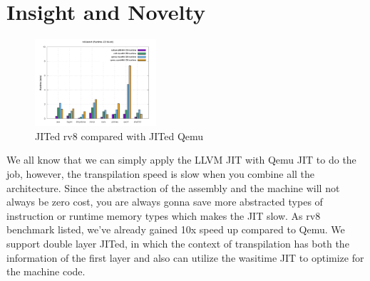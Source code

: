 \documentclass{article}
\begin{document}
\section{Insight and Novelty}
\begin{figure}[htbp]
\centering
   \includegraphics[width=0.4\textwidth]{rv8.png}
    \caption{JITed rv8 compared with JITed Qemu}
    \label{fig:my_label}
\end{figure}

We all know that we can simply apply the LLVM JIT with Qemu JIT to do the job, however, the transpilation speed is slow when you combine all the architecture. Since the abstraction of the assembly and the machine will not always be zero cost, you are always gonna save more abstracted types of instruction or runtime memory types which makes the JIT slow. As rv8 benchmark \cite{rv8} listed, we've already gained 10x speed up compared to Qemu. We support double layer JITed, in which the context of transpilation has both the information of the first layer and also can utilize the wasitime \cite{wasitime} JIT to optimize for the machine code.
\end{document}
